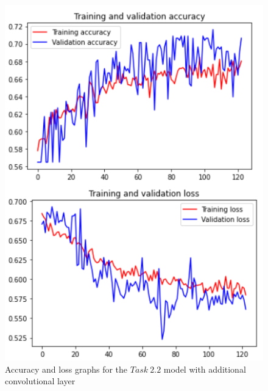 \documentclass[11pt,a4paper,oneside]{article}
\begin{document}
\begin{figure}[h]
\centering
	\begin{minipage}[c]{.4\textwidth}
		\centering\setlength{\captionmargin}{0pt}%
		\includegraphics[width=.9\textwidth]{images/2.2/5_acc}
		\caption{Accuracy and loss graphs for the $Task\ 2.2$ model with additional convolutional layer}
		\label{fig:accuracy_2.2_1}
	\end{minipage}
	\hspace{5mm}%
	\begin{minipage}[c]{.4\textwidth}
		\centering\setlength{\captionmargin}{0pt}%

\end{minipage}
\end{figure}
\end{document}
